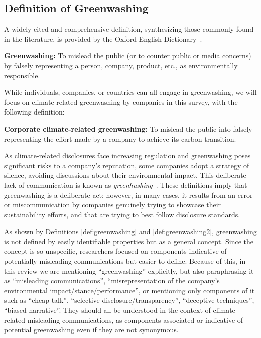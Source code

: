 \subsection{Definition of Greenwashing}

A widely cited and comprehensive definition, synthesizing those commonly found in the literature, is provided by the Oxford English Dictionary~\cite{GreenwashMeaningsEtymology2023}.

\begin{definition}\textbf{Greenwashing:}
    \label{def:greenwashing}
    To mislead the public (or to counter public or media concerns) by falsely representing a person, company, product, etc., as environmentally responsible.
\end{definition}


While individuals, companies, or countries can all engage in greenwashing, we will focus on climate-related greenwashing by companies in this survey, with the following definition: 
\begin{definition}
\label{def:greenwashing2}
   \textbf{Corporate climate-related greenwashing:} To mislead the public into falsely representing the effort made by a company to achieve its carbon transition.
\end{definition}

As climate-related disclosures face increasing regulation and greenwashing poses significant risks to a company's reputation, some companies adopt a strategy of silence, avoiding discussions about their environmental impact. This deliberate lack of communication is known as \textit{greenhushing}~\cite{Letzing}. These definitions imply that greenwashing is a deliberate act; however, in many cases, it results from an error or miscommunication by companies genuinely trying to showcase their sustainability efforts, and that are trying to best follow disclosure standards.

As shown by Definitions \ref{def:greenwashing} and \ref{def:greenwashing2}, greenwashing is not defined by easily identifiable properties but as a general concept. Since the concept is so unspecific, researchers focused on components indicative of potentially misleading communications but easier to define.  
Because of this, in this review we are mentioning ``greenwashing'' explicitly, but also paraphrasing it as ``misleading communications'', ``misrepresentation of the company's environmental impact/stance/performance'', or mentioning only components of it such as ``cheap talk'', ``selective disclosure/transparency'', ``deceptive techniques'', ``biased narrative''. They should all be understood in the context of climate-related misleading communications, as components associated or indicative of potential greenwashing even if they are not synonymous.

